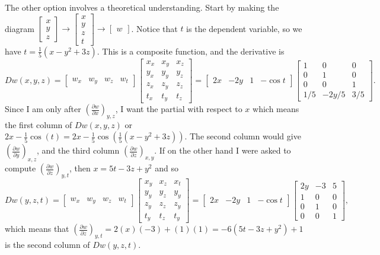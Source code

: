 The other option involves a theoretical understanding.  Start by
making the diagram $\begin{bmatrix}x\\y\\z\end{bmatrix}\to
\begin{bmatrix}x\\y\\z\\t\end{bmatrix}\to
\begin{bmatrix}w\end{bmatrix}$. Notice that $t$ is the dependent
variable, so we have $t=\frac{1}{5}(x-y^2+3z)$. This is a composite
function, and the derivative is
$$Dw(x,y,z)=\begin{bmatrix}w_x&w_y&w_z&w_t\end{bmatrix}\begin{bmatrix}x_x&x_y&x_z\\y_x&y_y&y_z\\z_x&z_y&z_z\\t_x&t_y&t_z\end{bmatrix}
= \begin{bmatrix}2x&-2y&1&-\cos
t\end{bmatrix}\begin{bmatrix}1&0&0\\0&1&0\\0&0&1\\1/5&-2y/5&3/5\end{bmatrix}.$$
Since I am only after $\displaystyle\left(\frac{\partial w}{\partial
x}\right)_{y,z}$, I want the partial with respect to $x$ which means
the first column of $Dw(x,y,z)$ or $2x-\frac{1}{5}\cos(t) =
2x-\frac{1}{5}\cos(\frac{1}{5}(x-y^2+3z))$.  The second column would
give $\displaystyle\left(\frac{\partial w}{\partial y}\right)_{x,z}$, and the third
column $\displaystyle\left(\frac{\partial w}{\partial z}\right)_{x,y}$. If on the
other hand I were asked to compute
$\displaystyle\left(\frac{\partial w}{\partial z}\right)_{y,t}$, then $x=5t-3z+y^2$
and so 
$$Dw(y,z,t)=\begin{bmatrix}w_x&w_y&w_z&w_t\end{bmatrix}\begin{bmatrix}x_y&x_z&x_t\\y_y&y_z&y_y\\z_y&z_z&z_y\\t_y&t_z&t_y\end{bmatrix}
= \begin{bmatrix}2x&-2y&1&-\cos
t\end{bmatrix}\begin{bmatrix}2y&-3&5\\1&0&0\\0&1&0\\0&0&1\end{bmatrix},$$
which means that $\displaystyle\left(\frac{\partial w}{\partial z}\right)_{y,t}=
2(x)(-3)+(1)(1)= -6(5t-3z+y^2)+1$ is the second column of $Dw(y,z,t)$. 


